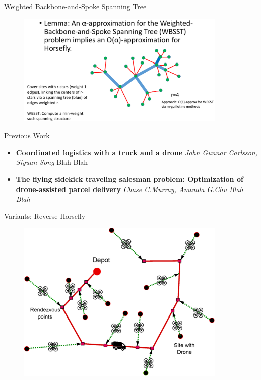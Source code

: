 \documentclass{beamer}
\begin{document}
\begin{frame}{Weighted Backbone-and-Spoke Spanning Tree}

  \begin{figure}
        \includegraphics[width=10.0cm]{slide_imgs/wbsst.png}
  \end{figure}

\end{frame}


\begin{frame}{Previous Work}
    \begin{itemize}
       \item \textbf{Coordinated logistics with a truck and a drone} \newline\textit{John Gunnar Carlsson, Siyuan Song} \newline Blah Blah
       \item \textbf{The flying sidekick traveling salesman problem: Optimization of drone-assisted parcel delivery} \newline \textit{Chase C.Murray, Amanda G.Chu} \newline \textit{Blah Blah}
    \end{itemize}
\end{frame}

\begin{frame}{Variants: Reverse Horsefly}
  \begin{figure}
    \centeringe
        \includegraphics[width=10.0cm]{slide_imgs/reverse_horsefly.eps}
  \end{figure}

\end{frame}
\end{document}
